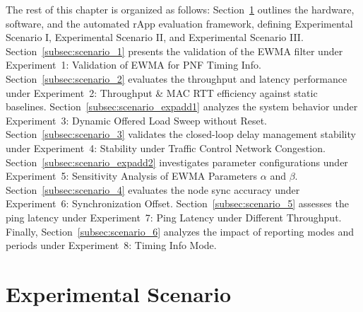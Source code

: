 \documentclass[../my_ntust_thesis.tex]{subfiles}
\begin{document}
The rest of this chapter is organized as follows: Section~\ref{subsec:experimental_scenario} outlines the hardware, software, and the automated rApp evaluation framework, defining Experimental Scenario I, Experimental Scenario II, and Experimental Scenario III. Section~\ref{subsec:scenario_1} presents the validation of the EWMA filter under Experiment~1: Validation of EWMA for PNF Timing Info. Section~\ref{subsec:scenario_2} evaluates the throughput and latency performance under Experiment~2: Throughput \& MAC RTT efficiency against static baselines. Section~\ref{subsec:scenario_expadd1} analyzes the system behavior under Experiment~3: Dynamic Offered Load Sweep without Reset. Section~\ref{subsec:scenario_3} validates the closed-loop delay management stability under Experiment~4: Stability under Traffic Control Network Congestion. Section~\ref{subsec:scenario_expadd2} investigates parameter configurations under Experiment~5: Sensitivity Analysis of EWMA Parameters \(\alpha\) and \(\beta\). Section~\ref{subsec:scenario_4} evaluates the node sync accuracy under Experiment~6: Synchronization Offset. Section~\ref{subsec:scenario_5} assesses the ping latency under Experiment~7: Ping Latency under Different Throughput. Finally, Section~\ref{subsec:scenario_6} analyzes the impact of reporting modes and periods under Experiment~8: Timing Info Mode.

\section{Experimental Scenario}
\label{subsec:experimental_scenario}
\end{document}
